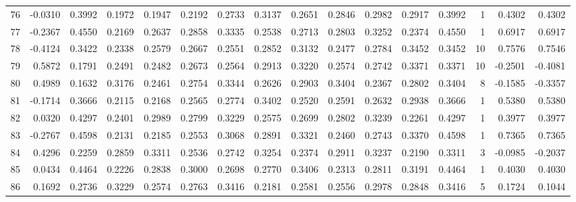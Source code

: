 \begin{tabular}{lrrrrrrrrrrrrrrr}
76  &     -0.0310 &  0.3992 &  0.1972 &  0.1947 &  0.2192 &  0.2733 &  0.3137 &  0.2651 &  0.2846 &  0.2982 &   0.2917 &     0.3992 &      1 &                    0.4302 &                     0.4302 \\
77  &     -0.2367 &  0.4550 &  0.2169 &  0.2637 &  0.2858 &  0.3335 &  0.2538 &  0.2713 &  0.2803 &  0.3252 &   0.2374 &     0.4550 &      1 &                    0.6917 &                     0.6917 \\
78  &     -0.4124 &  0.3422 &  0.2338 &  0.2579 &  0.2667 &  0.2551 &  0.2852 &  0.3132 &  0.2477 &  0.2784 &   0.3452 &     0.3452 &     10 &                    0.7576 &                     0.7546 \\
79  &      0.5872 &  0.1791 &  0.2491 &  0.2482 &  0.2673 &  0.2564 &  0.2913 &  0.3220 &  0.2574 &  0.2742 &   0.3371 &     0.3371 &     10 &                   -0.2501 &                    -0.4081 \\
80  &      0.4989 &  0.1632 &  0.3176 &  0.2461 &  0.2754 &  0.3344 &  0.2626 &  0.2903 &  0.3404 &  0.2367 &   0.2802 &     0.3404 &      8 &                   -0.1585 &                    -0.3357 \\
81  &     -0.1714 &  0.3666 &  0.2115 &  0.2168 &  0.2565 &  0.2774 &  0.3402 &  0.2520 &  0.2591 &  0.2632 &   0.2938 &     0.3666 &      1 &                    0.5380 &                     0.5380 \\
82  &      0.0320 &  0.4297 &  0.2401 &  0.2989 &  0.2799 &  0.3229 &  0.2575 &  0.2699 &  0.2802 &  0.3239 &   0.2261 &     0.4297 &      1 &                    0.3977 &                     0.3977 \\
83  &     -0.2767 &  0.4598 &  0.2131 &  0.2185 &  0.2553 &  0.3068 &  0.2891 &  0.3321 &  0.2460 &  0.2743 &   0.3370 &     0.4598 &      1 &                    0.7365 &                     0.7365 \\
84  &      0.4296 &  0.2259 &  0.2859 &  0.3311 &  0.2536 &  0.2742 &  0.3254 &  0.2374 &  0.2911 &  0.3237 &   0.2190 &     0.3311 &      3 &                   -0.0985 &                    -0.2037 \\
85  &      0.0434 &  0.4464 &  0.2226 &  0.2838 &  0.3000 &  0.2698 &  0.2770 &  0.3406 &  0.2313 &  0.2811 &   0.3191 &     0.4464 &      1 &                    0.4030 &                     0.4030 \\
86  &      0.1692 &  0.2736 &  0.3229 &  0.2574 &  0.2763 &  0.3416 &  0.2181 &  0.2581 &  0.2556 &  0.2978 &   0.2848 &     0.3416 &      5 &                    0.1724 &                     0.1044 \\

\end{tabular}
